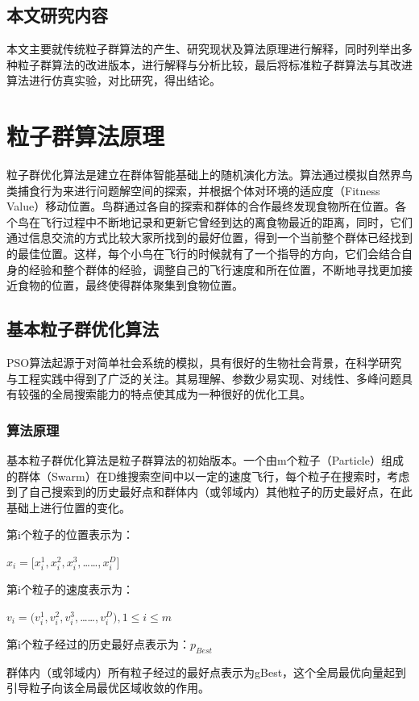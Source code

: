 \subsection{本文研究内容}
本文主要就传统粒子群算法的产生、研究现状及算法原理进行解释，同时列举出多种粒子群算法的改进版本，进行解释与分析比较，最后将标准粒子群算法与其改进算法进行仿真实验，对比研究，得出结论。
\section{粒子群算法原理}
粒子群优化算法是建立在群体智能基础上的随机演化方法。算法通过模拟自然界鸟类捕食行为来进行问题解空间的探索，并根据个体对环境的适应度（Fitness Value）移动位置。鸟群通过各自的探索和群体的合作最终发现食物所在位置。各个鸟在飞行过程中不断地记录和更新它曾经到达的离食物最近的距离，同时，它们通过信息交流的方式比较大家所找到的最好位置，得到一个当前整个群体已经找到的最佳位置。这样，每个小鸟在飞行的时候就有了一个指导的方向，它们会结合自身的经验和整个群体的经验，调整自己的飞行速度和所在位置，不断地寻找更加接近食物的位置，最终使得群体聚集到食物位置。

\subsection{基本粒子群优化算法}
PSO算法起源于对简单社会系统的模拟，具有很好的生物社会背景，在科学研究与工程实践中得到了广泛的关注。其易理解、参数少易实现、对线性、多峰问题具有较强的全局搜索能力的特点使其成为一种很好的优化工具。
\subsubsection{算法原理}
基本粒子群优化算法是粒子群算法的初始版本。一个由m个粒子（Particle）组成的群体（Swarm）在D维搜索空间中以一定的速度飞行，每个粒子在搜索时，考虑到了自己搜索到的历史最好点和群体内（或邻域内）其他粒子的历史最好点，在此基础上进行位置的变化。

 \noindent 第i个粒子的位置表示为：
 
 \centerline{$x_i=[x_i^1,x_i^2,x_i^3,$……$,x_i^D]$}


 \noindent 第i个粒子的速度表示为：
 
 \centerline{$v_i=(v_i^1,v_i^2,v_i^3,$……$,v_i^D),1\leq i\leq m$} 

\noindent 第i个粒子经过的历史最好点表示为：$p_{Best}$

 群体内（或邻域内）所有粒子经过的最好点表示为gBest，这个全局最优向量起到引导粒子向该全局最优区域收敛的作用。

